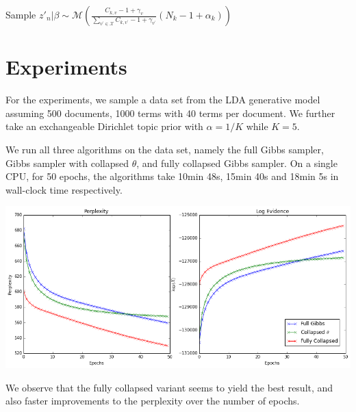 \documentclass[a0,portrait]{a0poster}
\begin{document}
\begin{multicols}{2}
\begin{minipage}{\linewidth}
	\label{alg:collapsed}
	\begin{algorithmic}[1]
		\State Sample $z'_n | \beta \sim \mathcal{M}(\frac{C_{k,v}  -1 + \gamma_{v}}{\sum_{ v^{\prime} \in \mathcal{X}}C_{k,v^{\prime}} - 1 + \gamma_{v^{\prime}}} (N_k - 1 + \alpha_k))$ 
		\EndFor
		\EndFor
		\EndFor
		\EndFunction
	\end{algorithmic}
\end{minipage}

\section{Experiments}

For the experiments, we sample a data set from the LDA generative model assuming 500 documents, 1000 terms with 40 terms per document. We further take an exchangeable Dirichlet topic prior with $\alpha = 1/K$ while $K = 5$. 

We run all three algorithms on the data set, namely the full Gibbs sampler, Gibbs sampler with collapsed $\theta$, and fully collapsed Gibbs sampler. On a single CPU, for 50 epochs, the algorithms take 10min 48s, 15min 40s and 18min 5s in wall-clock time respectively.

\vspace{2cm}
\begin{minipage}{\linewidth}
	\centering
	\label{fig:results}
	\includegraphics{results3}
\end{minipage}

We observe that the fully collapsed variant seems to yield the best result, and also faster improvements to the perplexity over the number of epochs. 



\end{multicols}
\end{document}
